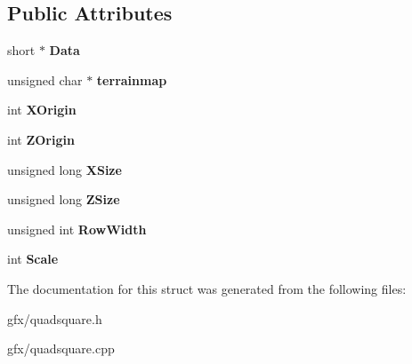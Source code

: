\subsection*{Public Attributes}
\begin{DoxyCompactItemize}
\item 
short $\ast$ {\bfseries Data}\hypertarget{structHeightMapInfo_acdd158a0f814c042164822f72caff719}{}\label{structHeightMapInfo_acdd158a0f814c042164822f72caff719}

\item 
unsigned char $\ast$ {\bfseries terrainmap}\hypertarget{structHeightMapInfo_a6d33a5e7d0aee643afa92d26ac34c293}{}\label{structHeightMapInfo_a6d33a5e7d0aee643afa92d26ac34c293}

\item 
int {\bfseries X\+Origin}\hypertarget{structHeightMapInfo_a87efbb0f2d9f3fd69ed96499e67e6247}{}\label{structHeightMapInfo_a87efbb0f2d9f3fd69ed96499e67e6247}

\item 
int {\bfseries Z\+Origin}\hypertarget{structHeightMapInfo_ad97551a36fecde554259a81aa08074ae}{}\label{structHeightMapInfo_ad97551a36fecde554259a81aa08074ae}

\item 
unsigned long {\bfseries X\+Size}\hypertarget{structHeightMapInfo_a335b301fb1bc923ee4e63494d051f010}{}\label{structHeightMapInfo_a335b301fb1bc923ee4e63494d051f010}

\item 
unsigned long {\bfseries Z\+Size}\hypertarget{structHeightMapInfo_a7846720d785ef0476dbc1cfecf9f98c9}{}\label{structHeightMapInfo_a7846720d785ef0476dbc1cfecf9f98c9}

\item 
unsigned int {\bfseries Row\+Width}\hypertarget{structHeightMapInfo_a49e7afaec2f5dc9a0d5f140f673ad1d5}{}\label{structHeightMapInfo_a49e7afaec2f5dc9a0d5f140f673ad1d5}

\item 
int {\bfseries Scale}\hypertarget{structHeightMapInfo_a9f450aa43ea22be6a10b73c92eaa1b75}{}\label{structHeightMapInfo_a9f450aa43ea22be6a10b73c92eaa1b75}

\end{DoxyCompactItemize}


The documentation for this struct was generated from the following files\+:\begin{DoxyCompactItemize}
\item 
gfx/quadsquare.\+h\item 
gfx/quadsquare.\+cpp\end{DoxyCompactItemize}
